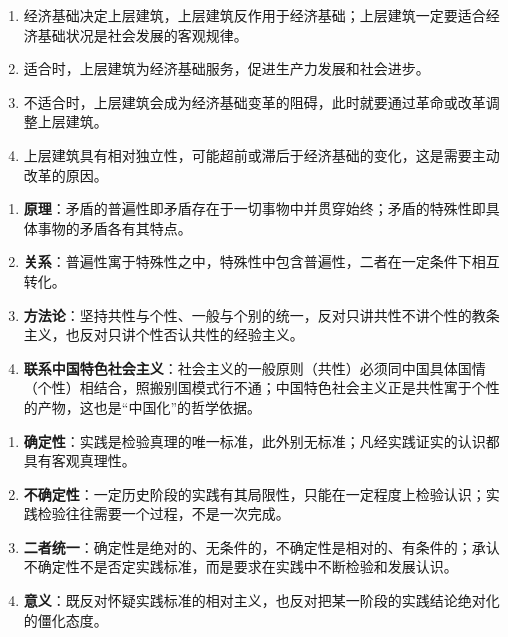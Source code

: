 \yaodian
\begin{enumerate}[label=(\arabic*),leftmargin=2.2em,itemsep=2pt,topsep=2pt]
\item 经济基础决定上层建筑，上层建筑反作用于经济基础；上层建筑一定要适合经济基础状况是社会发展的客观规律。
\item 适合时，上层建筑为经济基础服务，促进生产力发展和社会进步。
\item 不适合时，上层建筑会成为经济基础变革的阻碍，此时就要通过革命或改革调整上层建筑。
\item 上层建筑具有相对独立性，可能超前或滞后于经济基础的变化，这是需要主动改革的原因。
\end{enumerate}


\yaodian
\begin{enumerate}[label=(\arabic*),leftmargin=2.2em,itemsep=2pt,topsep=2pt]
\item \textbf{原理}：矛盾的普遍性即矛盾存在于一切事物中并贯穿始终；矛盾的特殊性即具体事物的矛盾各有其特点。
\item \textbf{关系}：普遍性寓于特殊性之中，特殊性中包含普遍性，二者在一定条件下相互转化。
\item \textbf{方法论}：坚持共性与个性、一般与个别的统一，反对只讲共性不讲个性的教条主义，也反对只讲个性否认共性的经验主义。
\item \textbf{联系中国特色社会主义}：社会主义的一般原则（共性）必须同中国具体国情（个性）相结合，照搬别国模式行不通；中国特色社会主义正是共性寓于个性的产物，这也是“中国化”的哲学依据。
\end{enumerate}

\yaodian
\begin{enumerate}[label=(\arabic*),leftmargin=2.2em,itemsep=2pt,topsep=2pt]
\item \textbf{确定性}：实践是检验真理的唯一标准，此外别无标准；凡经实践证实的认识都具有客观真理性。
\item \textbf{不确定性}：一定历史阶段的实践有其局限性，只能在一定程度上检验认识；实践检验往往需要一个过程，不是一次完成。
\item \textbf{二者统一}：确定性是绝对的、无条件的，不确定性是相对的、有条件的；承认不确定性不是否定实践标准，而是要求在实践中不断检验和发展认识。
\item \textbf{意义}：既反对怀疑实践标准的相对主义，也反对把某一阶段的实践结论绝对化的僵化态度。
\end{enumerate}

